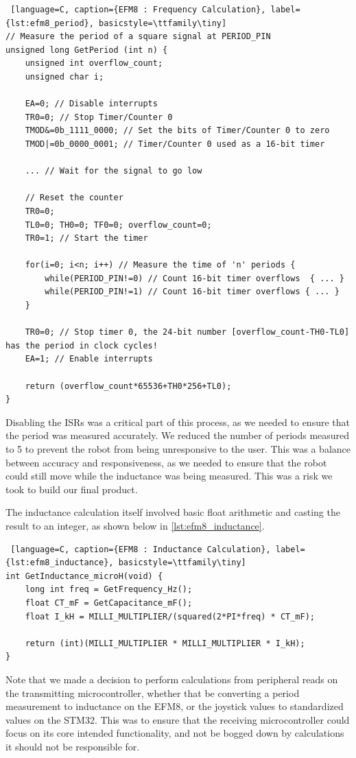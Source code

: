 \documentclass{article}
\begin{document}
\begin{lstlisting} [language=C, caption={EFM8 : Frequency Calculation}, label={lst:efm8_period}, basicstyle=\ttfamily\tiny]
// Measure the period of a square signal at PERIOD_PIN
unsigned long GetPeriod (int n) {
    unsigned int overflow_count;
    unsigned char i;

    EA=0; // Disable interrupts
    TR0=0; // Stop Timer/Counter 0
    TMOD&=0b_1111_0000; // Set the bits of Timer/Counter 0 to zero
    TMOD|=0b_0000_0001; // Timer/Counter 0 used as a 16-bit timer

    ... // Wait for the signal to go low

    // Reset the counter
    TR0=0;
    TL0=0; TH0=0; TF0=0; overflow_count=0;
    TR0=1; // Start the timer

    for(i=0; i<n; i++) // Measure the time of 'n' periods {
        while(PERIOD_PIN!=0) // Count 16-bit timer overflows  { ... }
        while(PERIOD_PIN!=1) // Count 16-bit timer overflows { ... }
    }

    TR0=0; // Stop timer 0, the 24-bit number [overflow_count-TH0-TL0] has the period in clock cycles!
    EA=1; // Enable interrupts

    return (overflow_count*65536+TH0*256+TL0);
}
\end{lstlisting}

Disabling the ISRs was a critical part of this process, as we needed to ensure that the period was measured accurately.
We reduced the number of periods measured to 5 to prevent the robot from being unresponsive to the user. This was a balance between
accuracy and responsiveness, as we needed to ensure that the robot could still move while the inductance was being measured. This was a risk we took
to build our final product.

The inductance calculation itself involved basic float arithmetic and casting the result to an integer, as shown below in \ref{lst:efm8_inductance}.

\begin{lstlisting} [language=C, caption={EFM8 : Inductance Calculation}, label={lst:efm8_inductance}, basicstyle=\ttfamily\tiny]
int GetInductance_microH(void) {
    long int freq = GetFrequency_Hz();
    float CT_mF = GetCapacitance_mF();
	float I_kH = MILLI_MULTIPLIER/(squared(2*PI*freq) * CT_mF);

    return (int)(MILLI_MULTIPLIER * MILLI_MULTIPLIER * I_kH);
}
\end{lstlisting}

Note that we made a decision to perform calculations from peripheral reads on the transmitting microcontroller, whether that be converting a period measurement to inductance on the EFM8,
or the joystick values to standardized values on the STM32. This was to ensure that the receiving microcontroller could focus on its core intended functionality, and not be bogged down by
calculations it should not be responsible for.
\end{document}
